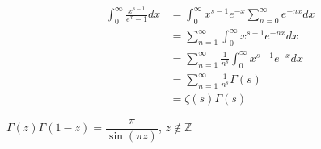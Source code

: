 \documentclass[main]{subfiles}
\begin{document}
\begin{proposition}
\begin{align*}
\int_0^\infty\frac{x^{s-1}}{e^x-1}dx&=\int_0^\infty x^{s-1}e^{-x}\sum_{n=0}^\infty e^{-nx}dx \\
&=\sum_{n=1}^\infty\int_0^\infty x^{s-1}e^{-nx}dx \\
&=\sum_{n=1}^\infty\frac{1}{n^s}\int_0^\infty x^{s-1}e^{-x}dx \\
&=\sum_{n=1}^\infty\frac{1}{n^s}\Gamma(s) \\
&=\zeta(s)\Gamma(s)
\end{align*}
\end{proposition}

\begin{theorem}
$\Gamma(z)\Gamma(1-z)=\dfrac{\pi}{\sin(\pi z)}$, $z\notin\mathbb Z$
\end{theorem}
\end{document}
